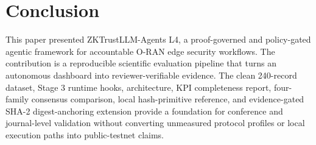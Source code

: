\section{Conclusion}
This paper presented ZKTrustLLM-Agents L4, a proof-governed and policy-gated agentic framework for accountable O-RAN edge security workflows. The contribution is a reproducible scientific evaluation pipeline that turns an autonomous dashboard into reviewer-verifiable evidence. The clean 240-record dataset, Stage 3 runtime hooks, architecture, KPI completeness report, four-family consensus comparison, local hash-primitive reference, and evidence-gated SHA-2 digest-anchoring extension provide a foundation for conference and journal-level validation without converting unmeasured protocol profiles or local execution paths into public-testnet claims.
